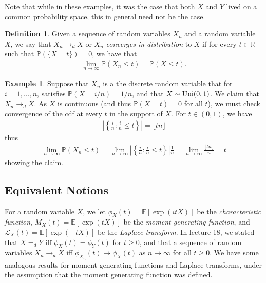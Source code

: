 \documentclass{article}
\theoremstyle{definition}
\newtheorem{definition}{Definition}
\newtheorem{example}{Example}
\renewcommand{\P}{\mathbb P}
\newcommand{\E}{\mathbb E}
\newcommand{\1}{\mathbb I}
\newcommand{\R}{\mathbb R}
\newcommand{\Uni}{\mathop{\text{\rm Uni}}}
\begin{document}
Note that while in these examples, it was the case that both $X$ and $Y$ lived on a common
probability space, this in general need not be the case.
\begin{definition}
  Given a sequence of random variables $X_n$ and a random variable $X$,
  we say that $X_n \to_d X$ or $X_n$ \emph{converges in distribution} to $X$
  if for every $t \in \R$ such that $\P(\{X = t\}) = 0$, we have that
  \begin{align*}
    \lim_{n \to \infty} \P(X_n \leq t) = \P(X \leq t).
  \end{align*}  
\end{definition}
\begin{small}
\begin{example}
  Suppose that $X_n$ is a the discrete random variable that for $i =
  1,\ldots,n$, satisfies $\P(X = i/n) = 1/n$, and that $X \sim
  \Uni(0,1)$.  We claim that $X_n \to_d X$.  As $X$ is continuous (and
  thus $\P(X = t) = 0$ for all $t$), we must check convergence of the
  cdf at every $t$ in the support of $X$.  For $t \in (0,1)$, we have
  \begin{align*}
    \left|\left\{\frac{i}{n} \colon \frac i n \leq t\right\}\right| =
    \lfloor t n \rfloor
  \end{align*}
  thus
  \begin{align*}
    \lim_{n \to \infty} \P(X_n \leq t) = \lim_{n \to \infty}
    \left|\left\{\frac{i}{n} \colon \frac i n \leq t\right\}\right|
    \frac{1}{n} = \lim_{n \to \infty}\frac{\lfloor t n\rfloor}{n} = t
  \end{align*}
  showing the claim.
\end{example}
\end{small}

\subsection{Equivalent Notions}

For a random variable $X$, we let $\phi_X(t) = \E[\exp(itX)]$ be the
\emph{characteristic function}, $M_X(t) = \E[\exp(tX)]$ be the
\emph{moment generating function}, and $\mathcal L_X(t) =
\E[\exp(-tX)]$ be the \emph{Laplace transform}.  In lecture 18, we stated that $X =_d Y$ iff
$\phi_X(t) =\phi_Y(t)$ for $t \geq 0$, and that a sequence of random
variables $X_n \to_d X$ iff $\phi_{X_n}(t) \to \phi_X(t)$ as $n \to
\infty$ for all $t \geq 0$.  We have some analogous results for moment
generating functions and Laplace transforms, under the assumption that the moment generating
function was defined.
\end{document}
